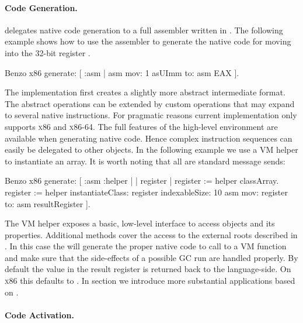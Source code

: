 \paragraph{Code Generation.}

\B delegates native code generation to a full assembler written in \ST. The following example shows how to use the assembler to generate the native code for moving  into the 32-bit register .
%
\begin{stcode}{4}
Benzo x86 generate: [ :asm |
	asm mov: 1 asUImm to: asm EAX ].
\end{stcode}
%
The implementation first creates a slightly more abstract intermediate format.
The abstract operations can be extended by custom operations that may expand to several native instructions. For pragmatic reasons current implementation only supports \textsc{x86} and \textsc{x86-64}.
The full features of the high-level environment are available when generating native code.
Hence complex instruction sequences can easily be delegated to other objects.
In the following example we use a VM helper to instantiate an array. It is worth noting that all are standard message sends:
%
\begin{stcode}{5}
Benzo x86 generate: [ :asm :helper | | register |
	register := helper classArray.
	register := helper 
		instantiateClass: register
		indexableSize: 10
	asm mov: register to: asm resultRegister ].
\end{stcode}
%
The VM helper exposes a basic, low-level interface to access objects and its properties.
Additional methods cover the access to the external roots described in .
In this case the  will generate the proper native code to call to a VM function and make sure that the side-effects of a possible GC run are handled properly.
By default the value in the result register is returned back to the language-side. On \textsc{x86} this defaults to .
In section  we introduce more substantial applications based on \B.

\paragraph{Code Activation.}
 
